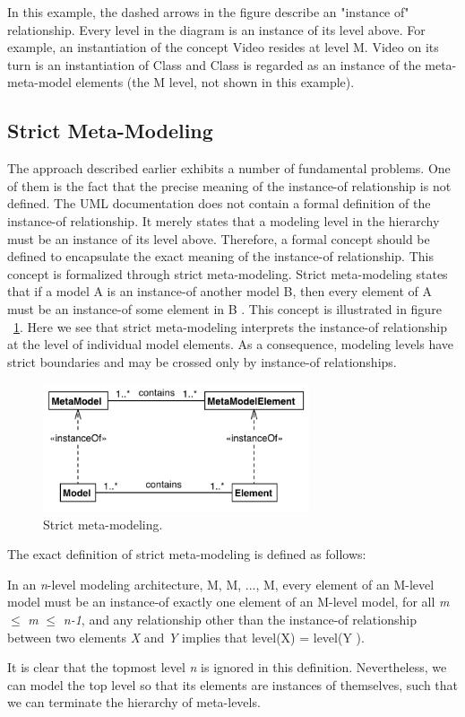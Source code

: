 In this example, the dashed arrows in the figure describe an "instance of" relationship. Every level in the diagram is an instance of its level above. For example, an instantiation of the concept Video resides at level M. Video on its turn is an instantiation of Class and Class is regarded as an instance of the meta-meta-model elements (the M level, not shown in this example).

\subsection{Strict Meta-Modeling}

The approach described earlier exhibits a number of fundamental problems. One of them is the fact that the precise meaning of the instance-of relationship is not defined. The UML documentation does not contain a formal definition of the instance-of relationship. It merely states that a modeling level in the hierarchy must be an instance of its level above. Therefore, a formal concept should be defined to encapsulate the exact meaning of the instance-of relationship. This concept is formalized through strict meta-modeling. Strict meta-modeling states that if a model A is an instance-of another model B, then every element of A must be an instance-of some element in B \cite{RearchitectingUML}. This concept is illustrated in figure ~\ref{fig:strict_mm}. Here we see that strict meta-modeling interprets the instance-of relationship at the level of individual model elements. As a consequence, modeling levels have strict boundaries and may be crossed only by instance-of relationships.
\begin{figure}[h!]
\centering
\includegraphics[width=0.7\textwidth]{images/chap2_strict_mm.png}
\caption{Strict meta-modeling.}
\label{fig:strict_mm}
\end{figure}
The exact definition of strict meta-modeling is defined as follows:
\begin{mydef}
In an \textit{n}-level modeling architecture, M, M, ..., M, every element of an M-level model must be an instance-of exactly one element of an M-level model, for all \textit{m} $\leq$ \textit{m} $\le$ \textit{n-1}, and any relationship other than the instance-of relationship between two elements \textit{X} and \textit{Y} implies that level(X) = level(Y ).
\end{mydef}
It is clear that the topmost level \textit{n} is ignored in this definition. Nevertheless, we can model the top level so that its elements are instances of themselves, such that we can terminate the hierarchy of meta-levels.

